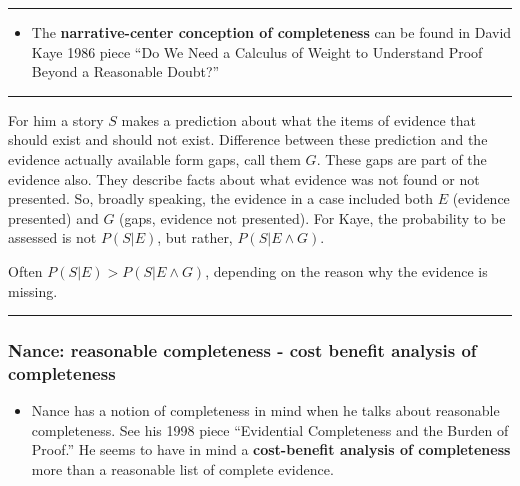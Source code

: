 \documentclass[
  10pt,
  dvipsnames,enabledeprecatedfontcommands]{scrartcl}
\providecommand{\tightlist}{%
  \setlength{\itemsep}{0pt}\setlength{\parskip}{0pt}}
\begin{document}
\begin{center}\rule{0.5\linewidth}{0.5pt}\end{center}

\begin{itemize}
\tightlist
\item
  The \textbf{narrative-center conception of completeness} can be found
  in David Kaye 1986 piece ``Do We Need a Calculus of Weight to
  Understand Proof Beyond a Reasonable Doubt?''
\end{itemize}

\begin{center}\rule{0.5\linewidth}{0.5pt}\end{center}

For him a story \(S\) makes a prediction about what the items of
evidence that should exist and should not exist. Difference between
these prediction and the evidence actually available form gaps, call
them \(G\). These gaps are part of the evidence also. They describe
facts about what evidence was not found or not presented. So, broadly
speaking, the evidence in a case included both \(E\) (evidence
presented) and \(G\) (gaps, evidence not presented). For Kaye, the
probability to be assessed is not \(P(S \vert E)\), but rather,
\(P(S \vert E \wedge G)\).

Often \(P(S \vert E) > P(S \vert E \wedge G)\), depending on the reason
why the evidence is missing.



\begin{center}\rule{0.5\linewidth}{0.5pt}\end{center}

\hypertarget{nance-reasonable-completeness---cost-benefit-analysis-of-completeness}{%
\subsubsection{Nance: reasonable completeness - cost benefit analysis of
completeness}\label{nance-reasonable-completeness---cost-benefit-analysis-of-completeness}}

\begin{itemize}
\tightlist
\item
  Nance has a notion of completeness in mind when he talks about
  reasonable completeness. See his 1998 piece ``Evidential Completeness
  and the Burden of Proof.'' He seems to have in mind a
  \textbf{cost-benefit analysis of completeness} more than a reasonable
  list of complete evidence.
\end{itemize}
\end{document}
